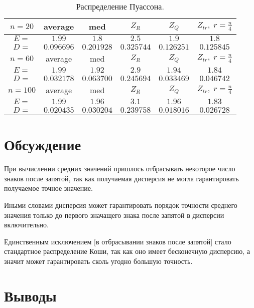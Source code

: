 \documentclass[a4]{article}
\begin{document}
\begin{table}[H]
\caption{\label{tab:poisson} Распределение Пуассона.}
\begin{center}
\begin{tabular}{|c|c|c|c|c|c|}
\hline
$n = 20$   & average & med & $Z_R$ & $Z_Q$ & $Z_{tr},\;r=\frac{n}{4}$\\ \hline
$E =$     &  	$1.99$    &	$1.8$  &  	$2.5$   & 	$1.9$  &  	$1.8$    \\ \hline
$D =$     &  	$0.096696$    &	$0.201928$    &	$0.325744$   & 	$0.126251$  &  	$0.125845$    \\ \hline
					
$n = 60$   & average & med & $Z_R$ & $Z_Q$ & $Z_{tr},\;r=\frac{n}{4}$\\ \hline
$E =$      & 	$1.99$    &	$1.92$    &	$2.9$   & 	$1.94$    &	$1.84$    \\ \hline
$D =$       &	$0.032178$    &	$0.063700$   & 	$0.245694$   & 	$0.033469$   & 	$0.046742$    \\ \hline
					
$n = 100$   & average & med & $Z_R$ & $Z_Q$ & $Z_{tr},\;r=\frac{n}{4}$\\ \hline
$E =$      & 	$1.99$    &	$1.96$    &	$3.1$  &  	$1.96$   & 	$1.83$    \\ \hline
$D =$      & 	$0.020435$    &	$0.030204$   & 	$0.239758$   & 	$0.018016$  &  	$0.026728$    \\
\hline
\end{tabular}
\end{center}
\end{table}


\section{Обсуждение}
\par При вычислении средних значений пришлось отбрасывать некоторое число знаков после запятой, так как получаемая дисперсия не могла гарантировать получаемое точное значение. \par Иными словами дисперсия может гарантировать порядок точности среднего значения только до первого значащего знака после запятой в дисперсии включительно. \par Единственным исключением [в отбрасывании знаков после запятой] стало стандартное распределение Коши, так как оно имеет бесконечную дисперсию, а значит может гарантировать сколь угодно большую точность.

\section{Выводы}
\end{document}
